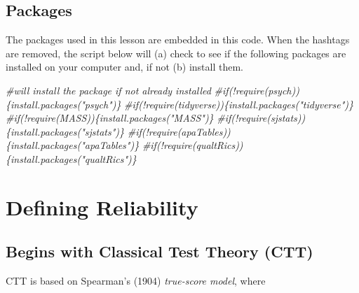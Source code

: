 \documentclass[
  english,
]{book}
\newenvironment{Shaded}{\begin{snugshade}}{\end{snugshade}}
\newcommand{\CommentTok}[1]{\textcolor[rgb]{0.56,0.35,0.01}{\textit{#1}}}
\begin{document}
\hypertarget{packages-3}{%
\subsection{Packages}\label{packages-3}}

The packages used in this lesson are embedded in this code. When the hashtags are removed, the script below will (a) check to see if the following packages are installed on your computer and, if not (b) install them.

\begin{Shaded}
\begin{Highlighting}[]
\CommentTok{\#will install the package if not already installed}
\CommentTok{\#if(!require(psych))\{install.packages("psych")\}}
\CommentTok{\#if(!require(tidyverse))\{install.packages("tidyverse")\}}
\CommentTok{\#if(!require(MASS))\{install.packages("MASS")\}}
\CommentTok{\#if(!require(sjstats))\{install.packages("sjstats")\}}
\CommentTok{\#if(!require(apaTables))\{install.packages("apaTables")\}}
\CommentTok{\#if(!require(qualtRics))\{install.packages("qualtRics")\}}
\end{Highlighting}
\end{Shaded}

\hypertarget{defining-reliability}{%
\section{Defining Reliability}\label{defining-reliability}}

\hypertarget{begins-with-classical-test-theory-ctt}{%
\subsection{Begins with Classical Test Theory (CTT)}\label{begins-with-classical-test-theory-ctt}}

CTT is based on Spearman's (1904) \emph{true-score model}, where
\end{document}
